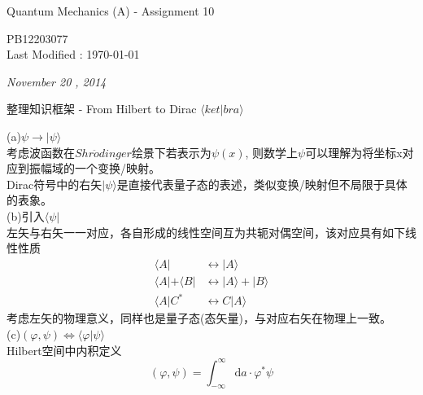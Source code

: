 \documentclass[a4paper]{article}
\begin{document}
    \begin{center}
        \textsf{\LARGE{Quantum Mechanics (A) - Assignment 10}}\\[20pt]
    \end{center}
    \begin{CJK*}{UTF8}{kai}
        \begin{flushright}
            \small PB12203077\\
            \small Last Modified : \today\\[30pt]
        \end{flushright}
    \end{CJK*}
    \noindent\Large{\emph{November 20 , 2014}}\\[15pt]
    \begin{CJK*}{UTF8}{song}
    \begin{CJK*}{UTF8}{hei}
    \noindent 整理知识框架 - From Hilbert to Dirac $\langle ket|bra\rangle$\\[12pt]
    \end{CJK*}
    {
    (a)$\psi\rightarrow|\psi\rangle$\\
    \indent 考虑波函数在$Shr\ddot{o}dinger$绘景下若表示为$\psi(x)$,
    则数学上$\psi$可以理解为将坐标x对应到振幅域的一个变换/映射。\\
    \indent Dirac符号中的右矢$|\psi\rangle$是直接代表量子态的表述，类似变换/映射但不局限于具体的表象。\\
    (b)引入$\langle\psi|$\\
    \indent 左矢与右矢一一对应，各自形成的线性空间互为共轭对偶空间，该对应具有如下线性性质
    \begin{equation*}\begin{split}
	\langle A| & \leftrightarrow|A\rangle\\
	\langle A|+\langle B| & \leftrightarrow|A\rangle+|B\rangle\\
	\langle A|C^{*} & \leftrightarrow C|A\rangle
     \end{split} \end{equation*}
	考虑左矢的物理意义，同样也是量子态(态矢量)，与对应右矢在物理上一致。\\
	(c)$(\varphi,\psi) \Leftrightarrow\langle\varphi | \psi\rangle$\\
	\indent Hilbert空间中内积定义
	\begin{displaymath}
		(\varphi,\psi)  = \int_{-\infty}^{\infty}\mathrm{d}a\cdot\varphi^{*}\psi
	\end{displaymath}
}
\end{CJK*}
\end{document}
